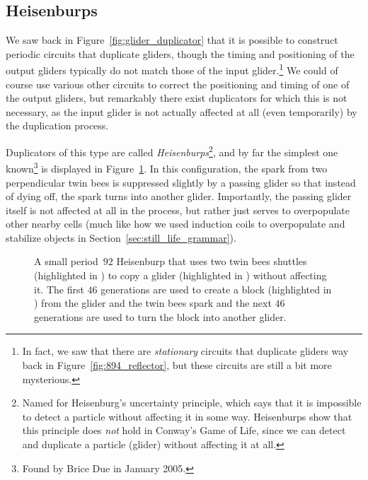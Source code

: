 \subsection{Heisenburps}\label{sec:p46_heisenburps}

We saw back in Figure~\ref{fig:glider_duplicator} that it is possible to construct periodic circuits that duplicate gliders, though the timing and positioning of the output gliders typically do not match those of the input glider.\footnote{In fact, we saw that there are \emph{stationary} circuits that duplicate gliders way back in Figure~\ref{fig:894_reflector}, but these circuits are still a bit more mysterious.} We could of course use various other circuits to correct the positioning and timing of one of the output gliders, but remarkably there exist duplicators for which this is not necessary, as the input glider is not actually affected at all (even temporarily) by the duplication process.

Duplicators of this type are called \emph{Heisenburps}\footnote{Named for Heisenburg's uncertainty principle, which says that it is impossible to detect a particle without affecting it in some way. Heisenburps show that this principle does \emph{not} hold in Conway's Game of Life, since we can detect and duplicate a particle (glider) without affecting it at all.}, and by far the simplest one known\footnote{Found by Brice Due in January 2005.} is displayed in Figure~\ref{fig:p46_natural_heisenburp}. In this configuration, the spark from two perpendicular twin bees is suppressed slightly by a passing glider so that instead of dying off, the spark turns into another glider. Importantly, the passing glider itself is not affected at all in the process, but rather just serves to overpopulate other nearby cells (much like how we used induction coils to overpopulate and stabilize objects in Section~\ref{sec:still_life_grammar}).

\begin{figure}[!htb]
	\centering
	\caption{A small period~$92$ Heisenburp that uses two twin bees shuttles (highlighted in ) to copy a glider (highlighted in ) without affecting it. The first $46$ generations are used to create a block (highlighted in ) from the glider and the twin bees spark and the next $46$ generations are used to turn the block into another glider.}\label{fig:p46_natural_heisenburp}
\end{figure}

